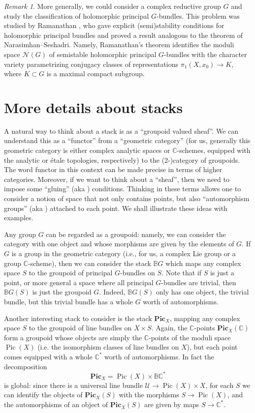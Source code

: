 \documentclass[12pt,a4paper]{amsbook}
\theoremstyle{remark} \newtheorem{rmk}[thm]{Remark}
\theoremstyle{definition} \newtheorem{defn}[thm]{Definition}
\theoremstyle{definition} \newtheorem{ex}[thm]{Example}
\theoremstyle{definition} \newtheorem{ej}{Exercise}
\let\emph\relax
\newcommand{\C}{\mathbb C}
\newcommand{\bbB}{\mathbb B}
\newcommand{\cN}{\mathcal N}
\DeclareMathOperator{\Pic}{Pic}
\begin{document}
\begin{rmk}
  More generally, we could consider a complex reductive group $G$ and study the classification of holomorphic principal $G$-bundles. This problem was studied by Ramanathan \cite{Ramanathan}, who gave explicit (semi)stability conditions for holomorphic principal bundles and proved a result analogous to the theorem of Narasimhan--Seshadri. Namely, Ramanathan's theorem identifies the moduli space $\cN(G)$ of semistable holomorphic principal $G$-bundles with the character variety parametrizing conjugacy classes of representations $\pi_1(X,x_0)\rightarrow K$, where $K\subset G$ is a maximal compact subgroup.
\end{rmk}

\section{More details about stacks} \label{ss:stacks}
A natural way to think about a stack is as a ``groupoid valued sheaf''. We can understand this as a ``functor'' from a ``geometric category'' (for us, generally this geometric category is either complex analytic spaces or $\C$-schemes, equipped with the analytic or étale topologies, respectively) to the (2-)category of groupoids. The word functor in this context can be made precise in terms of higher categories. Moreover, if we want to think about a ``sheaf'', then we need to impose some ``gluing'' (aka \emph{descent}) conditions. Thinking in these terms allows one to consider a notion of space that not only contains points, but also ``automorphism groups'' (aka \emph{inertia groups}) attached to each point. We shall illustrate these ideas with examples.

Any group $G$ can be regarded as a groupoid: namely, we can consider the category with one object and whose morphisms are given by the elements of $G$. If $G$ is a group in the geometric category (i.e., for us, a complex Lie group or a group $\C$-scheme), then we can consider the stack $\bbB G$ which maps any complex space $S$ to the groupoid of principal $G$-bundles on $S$. Note that if $S$ is just a point, or more general a space where all principal $G$-bundles are trivial, then $\bbB G(S)$ is just the groupoid $G$. Indeed, $\bbB G(S)$ only has one object, the trivial bundle, but this trivial bundle has a whole $G$ worth of automorphisms.

Another interesting stack to consider is the stack $\mathbf{Pic}_X$, mapping any complex space $S$ to the groupoid of line bundles on $X\times S$. Again, the $\C$-points $\mathbf{Pic}_X(\C)$ form a groupoid whose objects are simply the $\C$-points of the moduli space $\Pic(X)$ (i.e. the isomorphism classes of line bundles on $X$), but each point comes equipped with a whole $\C^*$ worth of automorphisms. In fact the decomposition
\begin{equation*}
\mathbf{Pic}_X = \Pic(X) \times \bbB \C^*
\end{equation*}
is global: since there is a universal line bundle $\mathscr{U}\rightarrow \Pic(X) \times X$, for each $S$ we can identify the objects of $\mathbf{Pic}_X(S)$ with the morphisms $S\rightarrow \Pic(X)$, and the automorphisms of an object of $\mathbf{Pic}_X(S)$ are given by maps $S\rightarrow \C^*$.
\end{document}
